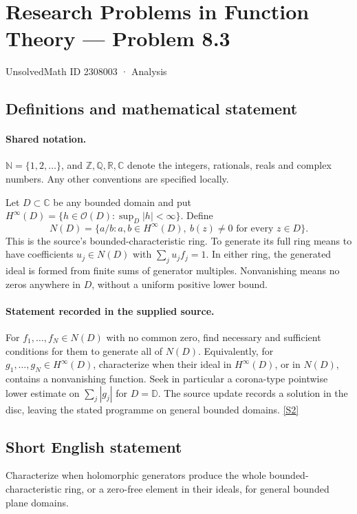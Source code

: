 \documentclass[11pt]{article}
\newcommand{\sref}[2]{\hyperlink{source:#1:#2}{[S#2]}}
\begin{document}
\setcounter{section}{2308002}
\section{Research Problems in Function Theory — Problem 8.3}\label{2308003}
{\small\sffamily UnsolvedMath ID 2308003 · Analysis}
\subsection{Definitions and mathematical statement}

\paragraph{Shared notation.}$\mathbb N=\{1,2,\ldots\}$, and $\mathbb Z,\mathbb Q,\mathbb R,\mathbb C$ denote the integers, rationals, reals and complex numbers. Any other conventions are specified locally.


Let $D\subset\mathbb C$ be any bounded domain and put $H^\infty(D)=\{h\in\mathcal O(D):\sup_D|h|<\infty\}$. Define
\[N(D)=\{a/b:a,b\in H^\infty(D),\ b(z)\ne0\text{ for every }z\in D\}.
\]
This is the source's bounded-characteristic ring. To generate its full ring means to have coefficients $u_j\in N(D)$ with $\sum_j u_jf_j=1$. In either ring, the generated ideal is formed from finite sums of generator multiples. Nonvanishing means no zeros anywhere in $D$, without a uniform positive lower bound.
\paragraph{Statement recorded in the supplied source.}
For $f_1,\ldots,f_N\in N(D)$ with no common zero, find necessary and sufficient conditions for them to generate all of $N(D)$. Equivalently, for $g_1,\ldots,g_N\in H^\infty(D)$, characterize when their ideal in $H^\infty(D)$, or in $N(D)$, contains a nonvanishing function. Seek in particular a corona-type pointwise lower estimate on $\sum_j|g_j|$ for $D=\mathbb D$. The source update records a solution in the disc, leaving the stated programme on general bounded domains. \sref{2308003}{2}
\subsection{Short English statement}
Characterize when holomorphic generators produce the whole bounded-characteristic ring, or a zero-free element in their ideals, for general bounded plane domains.
\end{document}
